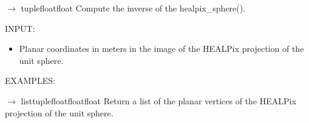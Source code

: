 \documentclass[a4paper,12ptopenany,oneside,english]{sphinxmanual}
\begin{document}
\begin{fulllineitems}
\label{\detokenize{pj_healpix:rhealpixdggs.pj_healpix.healpix_sphere_inverse}}
\pysigstartsignatures
\pysiglinewithargsret
{}
{\sphinxparamcomma {}}
{{ $\rightarrow$ tuple\DUrole{p}{{[}}floatfloat\DUrole{p}{{]}}}}
\pysigstopsignatures
\sphinxAtStartPar
Compute the inverse of the healpix\_sphere().

\sphinxAtStartPar
INPUT:
\begin{itemize}
\item {} 
\sphinxAtStartPar
{} \sphinxhyphen{} Planar coordinates in meters in the image of the
HEALPix projection of the unit sphere.

\end{itemize}

\sphinxAtStartPar
EXAMPLES:

\begin{sphinxVerbatim}[commandchars=\\\{\}]
    
\end{sphinxVerbatim}

\end{fulllineitems}


\begin{fulllineitems}
\label{\detokenize{pj_healpix:rhealpixdggs.pj_healpix.healpix_vertices}}
\pysigstartsignatures
\pysiglinewithargsret
{}
{}
{{ $\rightarrow$ list\DUrole{p}{{[}}tuple\DUrole{p}{{[}}floatfloatfloat\DUrole{p}{{]}}\DUrole{p}{{]}}}}
\pysigstopsignatures
\sphinxAtStartPar
Return a list of the planar vertices of the HEALPix projection of
the unit sphere.

\end{fulllineitems}
\end{document}
